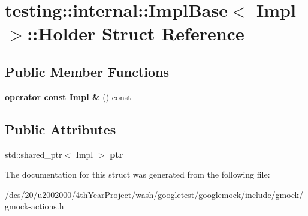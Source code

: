 \hypertarget{structtesting_1_1internal_1_1ImplBase_1_1Holder}{}\section{testing\+:\+:internal\+:\+:Impl\+Base$<$ Impl $>$\+:\+:Holder Struct Reference}
\label{structtesting_1_1internal_1_1ImplBase_1_1Holder}
\subsection*{Public Member Functions}
\begin{DoxyCompactItemize}
\item 
\mbox{\label{structtesting_1_1internal_1_1ImplBase_1_1Holder_a119207d1d7622e8bce62bfafe0667bfc}} 
{\bfseries operator const Impl \&} () const
\end{DoxyCompactItemize}
\subsection*{Public Attributes}
\begin{DoxyCompactItemize}
\item 
\mbox{\label{structtesting_1_1internal_1_1ImplBase_1_1Holder_aacbe9a0cec81d206e37119d990aa820d}} 
std\+::shared\+\_\+ptr$<$ Impl $>$ {\bfseries ptr}
\end{DoxyCompactItemize}


The documentation for this struct was generated from the following file\+:\begin{DoxyCompactItemize}
\item 
/dcs/20/u2002000/4th\+Year\+Project/wash/googletest/googlemock/include/gmock/gmock-\/actions.\+h\end{DoxyCompactItemize}
